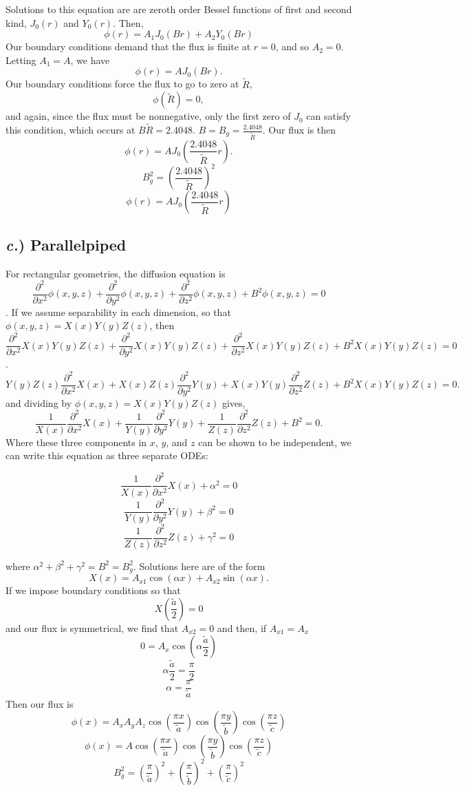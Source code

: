 \documentclass{article}
\newcommand{\p}{\partial}
\begin{document}
Solutions to this equation are are zeroth order Bessel functions of first and second kind, $J_0(r)$ and $Y_0(r)$. 
Then,
$$ \phi(r) = A_1 J_0(B r) + A_2 Y_0(B r) $$
Our boundary conditions demand that the flux is finite at $r = 0$, and so $A_2 = 0$. 
Letting $A_1 = A$, we have
$$ \phi(r) = A J_0(B r) .$$
Our boundary conditions force the flux to go to zero at $\tilde{R}$,
$$ \phi(\tilde{R}) = 0 ,$$
and again, since the flux must be nonnegative, only the first zero of $J_0$ can satisfy this condition, which occurs at $B \tilde{R} = 2.4048$. $B = B_g = \frac{2.4048}{\tilde{R}}$. Our flux is then
$$ \phi(r) = A J_0(\frac{2.4048}{\tilde{R}} r) .$$
$$\boxed{ B_g^2 = \left(\frac{2.4048}{\tilde{R}}\right)^2 }$$
$$\boxed{ \phi(r) = A J_0(\frac{2.4048}{\tilde{R}} r) }$$

\subsection*{\textit{c.}) Parallelpiped}

For rectangular geometries, the diffusion equation is
$$ \frac{\p^2}{\p x^2}\phi(x,y,z) + \frac{\p^2}{\p y^2}\phi(x,y,z) + \frac{\p^2}{\p z^2}\phi(x,y,z) + B^2\phi(x,y,z) = 0 $$.
If we assume separability in each dimension, so that $\phi(x,y,z) = X(x)Y(y)Z(z)$, then
$$ \frac{\p^2}{\p x^2}X(x)Y(y)Z(z) + \frac{\p^2}{\p y^2}X(x)Y(y)Z(z) + \frac{\p^2}{\p z^2}X(x)Y(y)Z(z) + B^2X(x)Y(y)Z(z) = 0 $$.
$$ Y(y)Z(z)\frac{\p^2}{\p x^2}X(x) + X(x)Z(z)\frac{\p^2}{\p y^2}Y(y) + X(x)Y(y)\frac{\p^2}{\p z^2}Z(z) + B^2X(x)Y(y)Z(z) = 0 .$$
and dividing by $\phi(x,y,z) = X(x)Y(y)Z(z)$ gives,
$$ \frac{1}{X(x)}\frac{\p^2}{\p x^2}X(x) + \frac{1}{Y(y)}\frac{\p^2}{\p y^2}Y(y) + \frac{1}{Z(z)}\frac{\p^2}{\p z^2}Z(z) + B^2 = 0 .$$
Where these three components in $x$, $y$, and $z$ can be shown to be independent, we can write this equation as three separate ODEs:

\begin{multicols}{3}
$$ \frac{1}{X(x)}\frac{\p^2}{\p x^2}X(x) + \alpha^2 = 0 $$
$$ \frac{1}{Y(y)}\frac{\p^2}{\p y^2}Y(y) + \beta^2 = 0 $$
$$ \frac{1}{Z(z)}\frac{\p^2}{\p z^2}Z(z) + \gamma^2 = 0 $$
\end{multicols}
where $\alpha^2 + \beta^2 + \gamma^2 = B^2 = B_g^2$. Solutions here are of the form
$$ X(x) = A_{x1}\cos(\alpha x) + A_{x2}\sin(\alpha x). $$
If we impose boundary conditions so that
$$ X(\frac{\tilde{a}}{2}) = 0 $$
and our flux is symmetrical, we find that $A_{x2} = 0$ and then, if $A_{x1} = A_x$
$$ 0 = A_x \cos(\alpha\frac{\tilde{a}}{2}) $$
$$ \alpha\frac{\tilde{a}}{2} = \frac{\pi}{2} $$
$$ \alpha = \frac{\pi}{\tilde{a}} $$
Then our flux is 
$$ \phi(x) = A_x A_y A_z \cos\left(\frac{\pi x}{\tilde{a}}\right) \cos\left(\frac{\pi y}{\tilde{b}}\right) \cos\left(\frac{\pi z}{\tilde{c}}\right) $$
$$\boxed{ \phi(x) = A \cos\left(\frac{\pi x}{\tilde{a}}\right) \cos\left(\frac{\pi y}{\tilde{b}}\right) \cos\left(\frac{\pi z}{\tilde{c}}\right) }$$
$$\boxed{ B_g^2 = \left(\frac{\pi}{\tilde{a}}\right)^2 + \left(\frac{\pi}{\tilde{b}}\right)^2 + \left(\frac{\pi}{\tilde{c}}\right)^2 }$$
\end{document}
